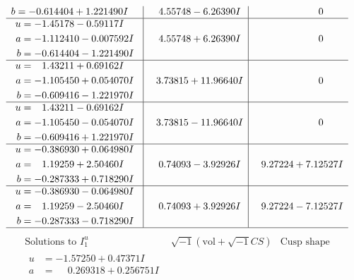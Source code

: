 \documentclass[1p]{elsarticle_modified}
\theoremstyle{definition}
\newcommand{\I}{\sqrt{-1}}
\begin{document}
$$\begin{array}{c|c|c}
\begin{aligned}
b &= -0.614404 + 1.221490 I\end{aligned}
 & \phantom{-}4.55748 - 6.26390 I & \phantom{-0.000000 } 0 \\ \hline\begin{aligned}
u &= -1.45178 - 0.59117 I \\
a &= -1.112410 - 0.007592 I \\
b &= -0.614404 - 1.221490 I\end{aligned}
 & \phantom{-}4.55748 + 6.26390 I & \phantom{-0.000000 } 0 \\ \hline\begin{aligned}
u &= \phantom{-}1.43211 + 0.69162 I \\
a &= -1.105450 + 0.054070 I \\
b &= -0.609416 - 1.221970 I\end{aligned}
 & \phantom{-}3.73815 + 11.96640 I & \phantom{-0.000000 } 0 \\ \hline\begin{aligned}
u &= \phantom{-}1.43211 - 0.69162 I \\
a &= -1.105450 - 0.054070 I \\
b &= -0.609416 + 1.221970 I\end{aligned}
 & \phantom{-}3.73815 - 11.96640 I & \phantom{-0.000000 } 0 \\ \hline\begin{aligned}
u &= -0.386930 + 0.064980 I \\
a &= \phantom{-}1.19259 + 2.50460 I \\
b &= -0.287333 + 0.718290 I\end{aligned}
 & \phantom{-}0.74093 - 3.92926 I & \phantom{-}9.27224 + 7.12527 I \\ \hline\begin{aligned}
u &= -0.386930 - 0.064980 I \\
a &= \phantom{-}1.19259 - 2.50460 I \\
b &= -0.287333 - 0.718290 I\end{aligned}
 & \phantom{-}0.74093 + 3.92926 I & \phantom{-}9.27224 - 7.12527 I\\
 \hline 
 \end{array}$$\newpage$$\begin{array}{c|c|c}  
\text{Solutions to }I^u_{1}& \I (\text{vol} + \sqrt{-1}CS) & \text{Cusp shape}\\
 \hline 
\begin{aligned}
u &= -1.57250 + 0.47371 I \\
a &= \phantom{-}0.269318 + 0.256751 I \\

\end{aligned}
\end{array}$$
\end{document}
